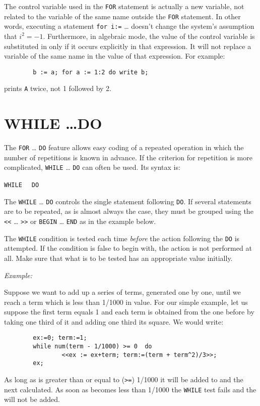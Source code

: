 The control variable used in the \texttt{FOR} statement is actually a new
variable, not related to the variable of the same name outside the 
\texttt{FOR} statement.  In other words, executing a statement 
\texttt{for i:=} \ldots
doesn't change the system's assumption that $i^{2} = -1$.
Furthermore, in algebraic mode, the value of the control variable is
substituted in  only if it occurs explicitly in that
expression.  It will not replace a variable of the same name in the value
of that expression.  For example:
\begin{verbatim}
        b := a; for a := 1:2 do write b;
\end{verbatim}
prints \texttt{A} twice, not 1 followed by 2.

\section{WHILE \ldots DO}
\hypertarget{command:WHILE}{}

The \texttt{FOR} \ldots{} \texttt{DO} feature
allows easy coding of a repeated operation in which the number of repetitions
is known in advance.  If the criterion for repetition is more complicated,
\texttt{WHILE} \ldots{} \texttt{DO} can often be used.  Its syntax is:
\begin{syntax}
      \texttt{WHILE } \texttt{ DO }
\end{syntax}
The \texttt{WHILE} \ldots{} \texttt{DO} controls the single statement
following \texttt{DO}.
If several statements are to be repeated, as is almost always the case,
they must be grouped using the \texttt{<}\texttt{<} \ldots{} \texttt{>}\texttt{>} 
or \texttt{BEGIN} \ldots{} \texttt{END}
as in the example below.

The \texttt{WHILE} condition is tested each time \emph{before} the action
following the \texttt{DO} is attempted.  If the condition is false to begin
with, the action is not performed at all.  Make sure that what is to be
tested has an appropriate value initially.

\textit{Example:}

Suppose we want to add up a series of terms, generated one by one, until
we reach a term which is less than 1/1000 in value.  For our simple
example, let us suppose the first term equals 1 and each term is obtained
from the one before by taking one third of it and adding one third its
square. We would write:
\begin{verbatim}
        ex:=0; term:=1;
        while num(term - 1/1000) >= 0  do
                <<ex := ex+term; term:=(term + term^2)/3>>;
        ex;
\end{verbatim}
As long as  is greater than or equal to (\texttt{>=}) 1/1000 it will
be added to  and the next  calculated.  As soon as
 becomes less than 1/1000 the \texttt{WHILE} test fails and the
 will not be added.


